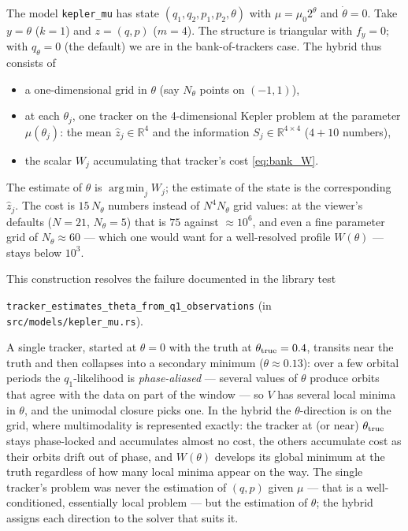 \documentclass[11pt,a4paper]{article}
\newcommand{\R}{\mathbb{R}}
\newcommand{\argmin}{\operatorname{arg\,min}}
\newcommand{\zh}{\hat{z}}
\theoremstyle{plain}
\theoremstyle{definition}
\theoremstyle{remark}
\begin{document}
The model \texttt{kepler\_mu} has state $(q_1,q_2,p_1,p_2,\theta)$ with $\mu=\mu_0 2^\theta$ and $\dot\theta=0$. Take $y=\theta$ ($k=1$) and $z=(q,p)$ ($m=4$). The structure is triangular with $f_y=0$; with $q_\theta=0$ (the default) we are in the bank-of-trackers case. The hybrid thus consists of
\begin{itemize}[nosep]
  \item a one-dimensional grid in $\theta$ (say $N_\theta$ points on $(-1,1)$),
  \item at each $\theta_j$, one tracker on the 4-dimensional Kepler problem at the parameter $\mu(\theta_j)$: the mean $\zh_j\in\R^4$ and the information $S_j\in\R^{4\times4}$ ($4+10$ numbers),
  \item the scalar $W_j$ accumulating that tracker's cost \eqref{eq:bank_W}.
\end{itemize}
The estimate of $\theta$ is $\argmin_j W_j$; the estimate of the state is the corresponding $\zh_j$. The cost is $15\,N_\theta$ numbers instead of $N^4 N_\theta$ grid values: at the viewer's defaults ($N=21$, $N_\theta=5$) that is $75$ against $\approx 10^6$, and even a fine parameter grid of $N_\theta\approx 60$ --- which one would want for a well-resolved profile $W(\theta)$ --- stays below $10^3$.

This construction resolves the failure documented in the library test
\begin{center}
  \texttt{tracker\_estimates\_theta\_from\_q1\_observations} \quad (in \texttt{src/models/kepler\_mu.rs}).
\end{center}
A single tracker, started at $\theta=0$ with the truth at $\theta_{\rm true}=0.4$, transits near the truth and then collapses into a secondary minimum ($\theta\approx0.13$): over a few orbital periods the $q_1$-likelihood is \emph{phase-aliased} --- several values of $\theta$ produce orbits that agree with the data on part of the window --- so $V$ has several local minima in $\theta$, and the unimodal closure picks one. In the hybrid the $\theta$-direction is on the grid, where multimodality is represented exactly: the tracker at (or near) $\theta_{\rm true}$ stays phase-locked and accumulates almost no cost, the others accumulate cost as their orbits drift out of phase, and $W(\theta)$ develops its global minimum at the truth regardless of how many local minima appear on the way. The single tracker's problem was never the estimation of $(q,p)$ given $\mu$ --- that is a well-conditioned, essentially local problem --- but the estimation of $\theta$; the hybrid assigns each direction to the solver that suits it.
\end{document}
